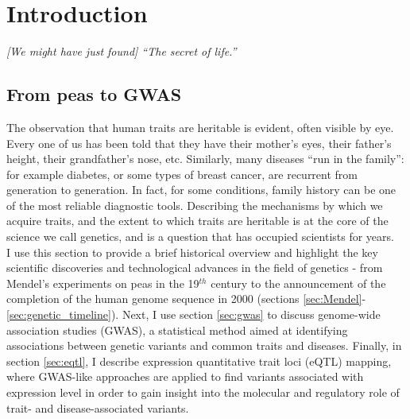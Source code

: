 
\chapter{Introduction}  %

\textit{[We might have just found] “The secret of life.”}\\

\section{From peas to GWAS}  %

The observation that human traits are heritable is evident, often visible by eye. 
Every one of us has been told that they have their mother’s eyes, their father’s height, their grandfather’s nose, etc. 
Similarly, many diseases “run in the family”: for example diabetes, or some types of breast cancer, are recurrent from generation to generation. 
In fact, for some conditions, family history can be one of the most reliable diagnostic tools. 
Describing the mechanisms by which we acquire traits, and the extent to which traits are heritable is at the core of the science we call genetics, and is a question that has occupied scientists for years.\\

I use this section to provide a brief historical overview and highlight the key scientific discoveries and technological advances in the field of genetics - from Mendel's experiments on peas in the 19$^{th}$ century to the announcement of the completion of the human genome sequence in 2000 (sections \ref{sec:Mendel}-\ref{sec:genetic_timeline}).
Next, I use section \ref{sec:gwas} to discuss genome-wide association studies (GWAS), a statistical method aimed at identifying associations between genetic variants and common traits and diseases.
Finally, in section \ref{sec:eqtl}, I describe expression quantitative trait loci (eQTL) mapping, where GWAS-like approaches are applied to find variants associated with expression level in order to gain insight into the molecular and regulatory role of trait- and disease-associated variants.

